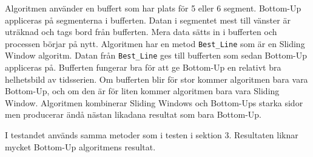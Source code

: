 \documentclass{article}
\begin{document}
Algoritmen använder en buffert som har plats för 5 eller 6 segment. Bottom-Up appliceras på segmenterna i bufferten. Datan i segmentet mest till vänster är uträknad och tags bord från bufferten. Mera data sätts in i bufferten och processen börjar på nytt. Algoritmen har en metod \texttt{Best_Line} som är en Sliding Window algoritm. Datan från \texttt{Best_Line} ges till bufferten som sedan Bottom-Up appliceras på. Bufferten fungerar bra för att ge Bottom-Up en relativt bra helhetsbild av tidsserien. Om bufferten blir för stor kommer algoritmen bara vara Bottom-Up, och om den är för liten kommer algoritmen bara vara Sliding Window. Algoritmen kombinerar Sliding Windows och Bottom-Ups starka sidor men producerar ändå nästan likadana resultat som bara Bottom-Up.

I testandet används samma metoder som i testen i sektion 3. Resultaten liknar mycket Bottom-Up algoritmens resultat.
\end{document}
